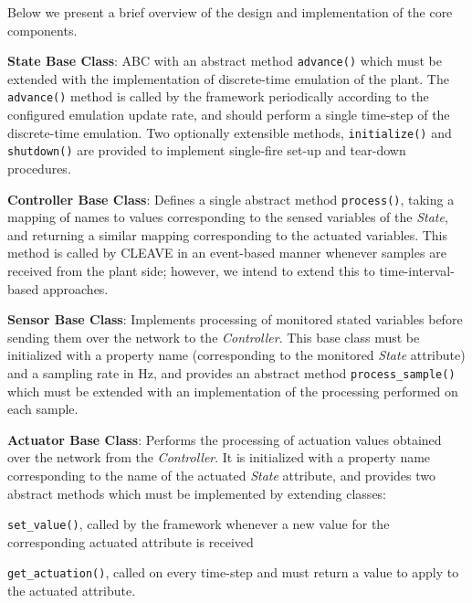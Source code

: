 Below we present a brief overview of the design and implementation of the core components.

\textbf{State Base Class}:
\ac{ABC} with an abstract method
\texttt{advance()} which must be extended with the implementation of discrete-time emulation of the plant.
The \texttt{advance()} method is called by the framework periodically according to the configured emulation update rate, and should perform a single time-step of the discrete-time emulation.
Two optionally extensible methods, \texttt{initialize()} and \texttt{shutdown()} are provided to implement single-fire set-up and tear-down procedures.


\textbf{Controller Base Class}:
Defines a single abstract method \texttt{process()}, taking a mapping of names to values corresponding to the sensed variables of the \emph{State}, and returning a similar mapping corresponding to the actuated variables.
This method is called by \ac{CLEAVE} in an event-based manner whenever samples are received from the plant side; however, we intend to extend this to time-interval-based approaches.

\textbf{Sensor Base Class}:
Implements processing of monitored stated variables before sending them over the network to the \emph{Controller}.
This base class must be initialized with a property name (corresponding to the monitored \emph{State} attribute) and a sampling rate in \si{\hertz}, and provides an abstract method \texttt{process_sample()} which must be extended with an implementation of the processing performed on each sample.

\textbf{Actuator Base Class}:
Performs the processing of actuation values obtained over the network from the \emph{Controller}.
It is initialized with a property name corresponding to the name of the actuated \emph{State} attribute, and provides two abstract methods which must be implemented by extending classes:
\begin{enumerate*}[itemjoin={{; }}, itemjoin*={{; and }}]
\item \texttt{set_value()}, called by the framework whenever a new value for the corresponding actuated attribute is received
\item \texttt{get_actuation()}, called on every time-step and must return a value to apply to the actuated attribute.
\end{enumerate*}


